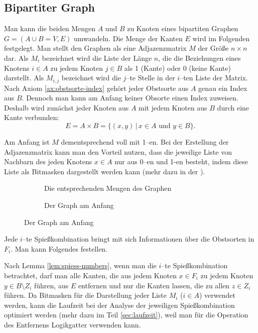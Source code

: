 \subsection{Bipartiter Graph}
Man kann die beiden Mengen $A$ und $B$ zu Knoten eines bipartiten Graphen $G = (A \cup B = V, E)$ umwandeln.
Die Menge der Kanten $E$ wird im Folgenden festgelegt.
Man stellt den Graphen als eine Adjazenzmatrix $M$ der Größe $n \times n$ dar. 
Als $M_i$ bezeichnet wird die Liste der Länge $n$,
die die Beziehungen eines Knotens
$i \in A$ zu jedem Knoten $j \in B$ als 1 (Kante) oder 0 (keine Kante) darstellt.
Als $M_{i, j}$ bezeichnet wird die $j$--te Stelle in der $i$--ten Liste der Matrix.\\
Nach Axiom \ref{ax:obstsorte-index} gehört jeder Obstsorte aus $A$ genau ein Index aus $B$.
Dennoch man kann am Anfang keiner Obsorte einen Index zuweisen.
Deshalb wird zunächst jeder Knoten aus $A$ mit jedem Knoten aus $B$ durch eine Kante verbunden:
\[
E = A\times B = \{(x, y) \,|\,  x \in A \text{ und } y \in B\}.
\]

Am Anfang ist $M$ dementsprechend voll mit 1--en.
Bei der Erstellung der Adjazenzmatrix kann man den Vorteil nutzen, dass die jeweilige 
Liste von Nachbarn des jeden Knotens $x \in A$ nur aus 0--en und 1-en besteht, indem
 diese Liste als Bitmasken dargestellt werden kann (mehr dazu in der ).

\begin{figure}[H]
\centering
\caption{Beide Abbildungen stellen den Graphen für das Beispiel aus der Aufgabenstellung dar.\\
Die Buchstaben stehen für die entsprechenden Obstsorten aus diesem Beispiel (s. auch \ref{example:0}).}
\begin{subfigure}[b]{.49\textwidth}
\centering

\caption{Die entsprechenden Mengen des Graphen}
\label{fig:graph-anfang}
\end{subfigure}
\begin{subfigure}[b]{.49\textwidth}
\centering

\caption{Der Graph am Anfang}
\label{fig:graph-full}
\end{subfigure}
\end{figure}

Jede $i$--te Spießkombination bringt mit sich Informationen über die Obstsorten in $F_i$.
Man kann Folgendes festellen. 



Nach Lemma \ref{lem:spiess-numbers}, wenn man die $i$--te Spießkombination betrachtet,
 darf man alle Kanten, die aus jedem Knoten $x \in F_i$ 
zu jedem Knoten $y \in B \setminus Z_i$ führen, aus $E$ entfernen und nur die Kanten lassen, die
zu allen $z \in Z_i$ führen.
Da Bitmasken für die Darstellung jeder Liste $M_i$ ($i \in A$) verwendet werden, kann
die Laufzeit bei der Analyse der jeweiligen Spießkombination optimiert werden
(mehr dazu im Teil \ref{sec:laufzeit}),
weil man für die Operation des Entfernens Logikgatter verwenden kann.

